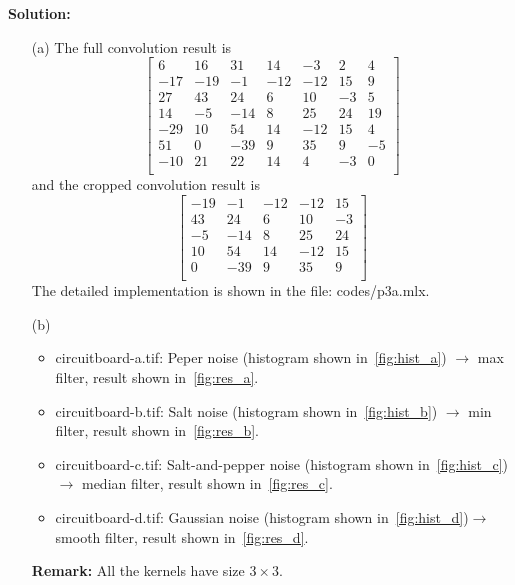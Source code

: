 \documentclass[11pt,letterpaper]{article}
\begin{document}
\textbf{Solution:}
\begin{itemize}
	\item [(a)] The full convolution result is 
	\[\begin{bmatrix}
		6 	& 	16 	& 	31 	& 	14 	& 	-3 	& 	2 	& 	4 \\
		-17 & 	-19 & 	-1	& 	-12	& 	-12 & 	15 	& 	9 \\
		27 	& 	43 	& 	24	& 	6	& 	10 	& 	-3 	& 	5 \\
		14	& 	-5 	& 	-14	& 	8	& 	25 	& 	24 	& 	19\\
		-29	& 	10 	& 	54	& 	14	& 	-12	& 	15 	& 	4 \\
		51	& 	0 	& 	-39	& 	9	& 	35	&	9	& 	-5\\
		-10	& 	21 	& 	22	& 	14	& 	4	& 	-3	& 	0 \\
	\end{bmatrix}\]
	and the cropped convolution result is 
	\[\begin{bmatrix}
		-19 & 	-1	& 	-12	& 	-12 & 	15 	\\
		43 	& 	24	& 	6	& 	10 	& 	-3 	\\
		-5 	& 	-14	& 	8	& 	25 	& 	24 	\\
		10 	& 	54	& 	14	& 	-12	& 	15 	\\
		0 	& 	-39	& 	9	& 	35	&	9	\\
	\end{bmatrix}\]
	The detailed implementation is shown in the file: codes/p3a.mlx.
	\item [(b)] 
	\begin{itemize}
		\item circuitboard-a.tif: Peper noise (histogram shown in~\ref{fig:hist_a}) $\to$ max filter, result shown in~\ref{fig:res_a}.
		\item circuitboard-b.tif: Salt noise (histogram shown in~\ref{fig:hist_b}) $\to$ min filter, result shown in~\ref{fig:res_b}.
		\item circuitboard-c.tif: Salt-and-pepper noise (histogram shown in~\ref{fig:hist_c})$\to$ median filter, result shown in~\ref{fig:res_c}.
		\item circuitboard-d.tif: Gaussian noise (histogram shown in~\ref{fig:hist_d})$\to$ smooth filter, result shown in~\ref{fig:res_d}.
	\end{itemize}
	{\bf Remark:} All the kernels have size $3\times 3$.
	\begin{figure}
		\centering
\end{figure}
\end{itemize}
\end{document}
